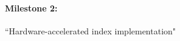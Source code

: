 \documentclass[11pt,letterpaper]{article}
\begin{document}
\paragraph{Milestone 2:} ``Hardware-accelerated index implementation"



\end{document}
